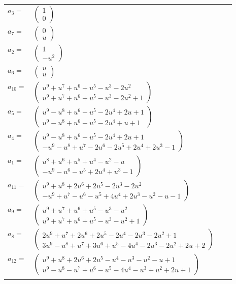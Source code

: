 \documentclass[1p]{elsarticle_modified}
\theoremstyle{definition}
\begin{document}
\begin{tabular}{m{7pt} m{180pt} m{7pt} m{180pt} }
\flushright $a_{3}=$&$\begin{pmatrix}1\\0\end{pmatrix}$ \\
\flushright $a_{7}=$&$\begin{pmatrix}0\\u\end{pmatrix}$ \\
\flushright $a_{2}=$&$\begin{pmatrix}1\\- u^2\end{pmatrix}$ \\
\flushright $a_{6}=$&$\begin{pmatrix}u\\u\end{pmatrix}$ \\
\flushright $a_{10}=$&$\begin{pmatrix}u^9+u^7+u^6+u^5- u^3-2 u^2\\u^9+u^7+u^6+u^5- u^3-2 u^2+1\end{pmatrix}$ \\
\flushright $a_{5}=$&$\begin{pmatrix}u^9- u^8+u^6- u^5-2 u^4+2 u+1\\u^9- u^8+u^6- u^5-2 u^4+u+1\end{pmatrix}$ \\
\flushright $a_{4}=$&$\begin{pmatrix}u^9- u^8+u^6- u^5-2 u^4+2 u+1\\- u^9- u^8+u^7-2 u^6-2 u^5+2 u^4+2 u^3-1\end{pmatrix}$ \\
\flushright $a_{1}=$&$\begin{pmatrix}u^8+u^6+u^5+u^4- u^2- u\\- u^9- u^6- u^5+2 u^4+u^3-1\end{pmatrix}$ \\
\flushright $a_{11}=$&$\begin{pmatrix}u^9+u^8+2 u^6+2 u^5-2 u^3-2 u^2\\- u^9+u^7- u^6- u^5+4 u^4+2 u^3- u^2- u-1\end{pmatrix}$ \\
\flushright $a_{9}=$&$\begin{pmatrix}u^9+u^7+u^6+u^5- u^3- u^2\\u^9+u^7+u^6+u^5- u^3- u^2+1\end{pmatrix}$ \\
\flushright $a_{8}=$&$\begin{pmatrix}2 u^9+u^7+2 u^6+2 u^5-2 u^4-2 u^3-2 u^2+1\\3 u^9- u^8+u^7+3 u^6+u^5-4 u^4-2 u^3-2 u^2+2 u+2\end{pmatrix}$ \\
\flushright $a_{12}=$&$\begin{pmatrix}u^9+u^8+2 u^6+2 u^5- u^4- u^3- u^2- u+1\\u^9- u^8- u^7+u^6- u^5-4 u^4- u^3+u^2+2 u+1\end{pmatrix}$\\&\end{tabular}
\end{document}
